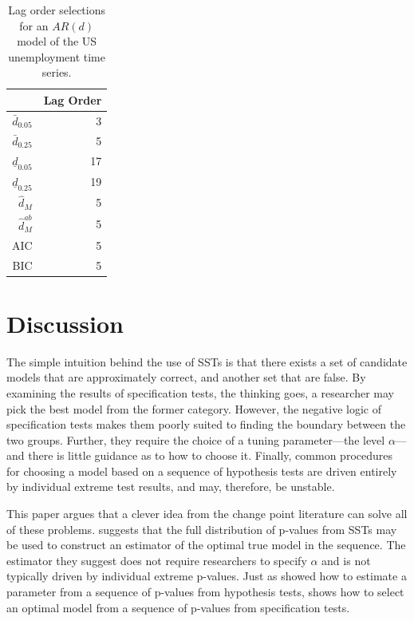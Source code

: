 \documentclass[sts]{imsart}\usepackage[]{graphicx}\usepackage[]{color}
\newcommand{\dhatm}{\hat{d}_M}
\newcommand{\dhatmab}{\hat{d}^{ab}_M}
\begin{document}
\begin{table}[ht]
\centering
\begin{tabular}{rr}
  \hline
 & Lag Order \\ 
  \hline
$\bar{d}_{0.05}$ &   3 \\ 
  $\bar{d}_{0.25}$ &   5 \\ 
  $\underline{d}_{0.05}$ &  17 \\ 
  $\underline{d}_{0.25}$ &  19 \\ 
  $\dhatm$ &   5 \\ 
  $\dhatmab$ &   5 \\ 
  AIC &   5 \\ 
  BIC &   5 \\ 
   \hline
\end{tabular}
\caption{Lag order selections for an $AR(d)$ model of the US unemployment time series.} 
\label{tab:ts}
\end{table}


\section{Discussion}\label{sec:discussion}
The simple intuition behind the use of SSTs is that there exists a set
of candidate models that are approximately correct, and another set
that are false.
By examining the results of specification tests, the thinking goes, a
researcher may pick the best model from the former category.
However, the negative logic of specification tests makes them poorly
suited to finding the boundary between the two groups.
Further, they require the choice of a tuning parameter---the level
$\alpha$---and there is little guidance as to how to choose it.
Finally, common procedures for choosing a model based on a sequence of
hypothesis tests are driven entirely by individual extreme test
results, and may, therefore, be unstable.

This paper argues that a clever idea from the change point literature
can solve all of these problems.
\citet{mallik} suggests that the full distribution of p-values from
SSTs may be used to construct an estimator of the optimal true model
in the sequence.
The estimator they suggest does not require researchers to specify
$\alpha$ and is not typically driven by individual extreme p-values.
Just as \citet{hodgeslehmann} showed how to estimate a parameter from
a sequence of p-values from hypothesis tests, \citet{mallik} shows how
to select an optimal model from a sequence of p-values from
specification tests.
\end{document}
